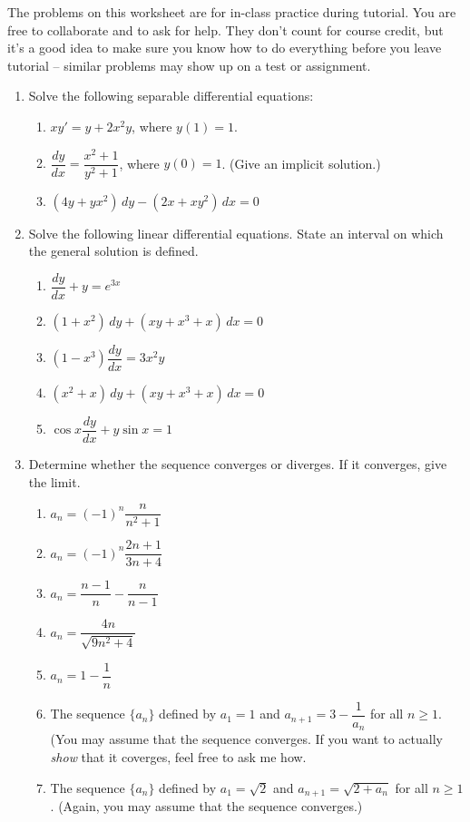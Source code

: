 \documentclass[12pt]{article}
\begin{document}
\thispagestyle{fancy}
The problems on this worksheet are for in-class practice during tutorial. You are free to collaborate and to ask for help. They don't count for course credit, but it's a good idea to make sure you know how to do everything before you leave tutorial -- similar problems may show up on a test or assignment.

\begin{enumerate}
 \item Solve the following separable differential equations:
\begin{enumerate}
 \item $xy' = y+2x^2y$, where $y(1)=1$.
 \item $\dfrac{dy}{dx} = \dfrac{x^2+1}{y^2+1}$, where $y(0)=1$. (Give an implicit solution.)
 \item $(4y+yx^2)\,dy - (2x+xy^2)\,dx = 0$
\end{enumerate}
 \item Solve the following linear differential equations. State an interval on which the general solution is defined.
\begin{enumerate}
 \item $\dfrac{dy}{dx}+y=e^{3x}$
 \item $(1+x^2)\,dy+(xy+x^3+x)\,dx = 0$
 \item $(1-x^3)\dfrac{dy}{dx}=3x^2y$
 \item $(x^2+x)\,dy+(xy+x^3+x)\,dx = 0$
 \item $\cos x\dfrac{dy}{dx}+y\sin x =1$
\end{enumerate}
\item Determine whether the sequence converges or diverges. If it converges, give the limit.
\begin{enumerate}
 \item $a_n = (-1)^n\dfrac{n}{n^2+1}$
 \item $a_n = (-1)^n\dfrac{2n+1}{3n+4}$
 \item $a_n = \dfrac{n-1}{n}-\dfrac{n}{n-1}$
 \item $a_n = \dfrac{4n}{\sqrt{9n^2+4}}$
 \item $a_n = 1-\dfrac{1}{n}$
 \item The sequence $\{a_n\}$ defined by $a_1=1$ and $a_{n+1} = 3-\dfrac{1}{a_n}$ for all $n\geq 1$. (You may assume that the sequence converges. If you want to actually \textit{show} that it coverges, feel free to ask me how.
 \item The sequence $\{a_n\}$ defined by $a_1 = \sqrt{2}$ and $a_{n+1} = \sqrt{2+a_n}$ for all $n\geq 1$. (Again, you may assume that the sequence converges.)
\end{enumerate}



\end{enumerate}
\end{document}
